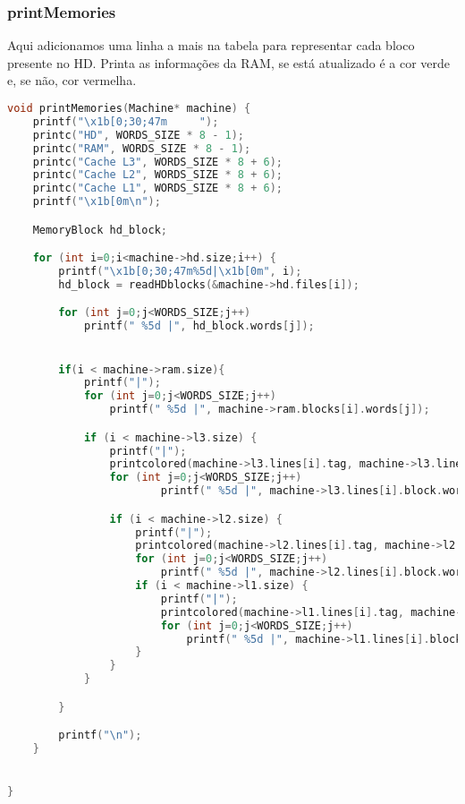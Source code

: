 \documentclass{article}
\begin{document}
\subsubsection{printMemories}

Aqui adicionamos uma linha a mais na tabela para representar cada bloco presente no HD.
Printa as informações da RAM, se está atualizado é a cor verde e, se não, cor vermelha.

\begin{lstlisting}[caption={Função printMemories},label={lst:cod4},language=C]
    void printMemories(Machine* machine) {
    printf("\x1b[0;30;47m     ");
    printc("HD", WORDS_SIZE * 8 - 1);
    printc("RAM", WORDS_SIZE * 8 - 1);
    printc("Cache L3", WORDS_SIZE * 8 + 6);
    printc("Cache L2", WORDS_SIZE * 8 + 6);
    printc("Cache L1", WORDS_SIZE * 8 + 6);
    printf("\x1b[0m\n");

    MemoryBlock hd_block;

    for (int i=0;i<machine->hd.size;i++) {
        printf("\x1b[0;30;47m%5d|\x1b[0m", i);
        hd_block = readHDblocks(&machine->hd.files[i]);

        for (int j=0;j<WORDS_SIZE;j++)
            printf(" %5d |", hd_block.words[j]);


        if(i < machine->ram.size){
            printf("|");
            for (int j=0;j<WORDS_SIZE;j++)
                printf(" %5d |", machine->ram.blocks[i].words[j]);

            if (i < machine->l3.size) {
                printf("|");
                printcolored(machine->l3.lines[i].tag, machine->l3.lines[i].updated);
                for (int j=0;j<WORDS_SIZE;j++)
                        printf(" %5d |", machine->l3.lines[i].block.words[j]);

                if (i < machine->l2.size) {
                    printf("|");
                    printcolored(machine->l2.lines[i].tag, machine->l2.lines[i].updated);
                    for (int j=0;j<WORDS_SIZE;j++)
                        printf(" %5d |", machine->l2.lines[i].block.words[j]);
                    if (i < machine->l1.size) {
                        printf("|");
                        printcolored(machine->l1.lines[i].tag, machine->l1.lines[i].updated);
                        for (int j=0;j<WORDS_SIZE;j++)
                            printf(" %5d |", machine->l1.lines[i].block.words[j]);
                    }
                }
            }

        }

        printf("\n");
    }


}
    

\end{lstlisting}
\clearpage
\end{document}
